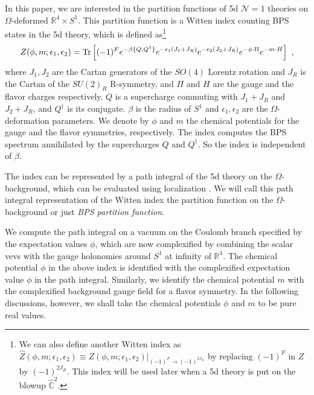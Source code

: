 In this paper, we are interested in the partition functions of 5d $\mathcal{N}=1$ theories on $\Omega$-deformed $\mathbb{R}^4\times S^1$. This partition function is a Witten index counting BPS states in the 5d theory, which is defined as\footnote{We can also define another Witten index as $\hat{Z}(\phi,m;\epsilon_1,\epsilon_2) \equiv Z(\phi,m;\epsilon_1,\epsilon_2)|_{(-1)^F\rightarrow (-1)^{2J_R}}$ by replacing $(-1)^F$ in $Z$ by $(-1)^{2J_R}$. This index will be used later when a 5d theory is put on the blowup $\hat{\mathbb{C}}^2$.} \cite{Nekrasov:2002qd}
\begin{equation}\label{eq:Z}
	Z(\phi,m;\epsilon_1,\epsilon_2) = {\rm Tr}\left[(-1)^Fe^{-\beta\{Q,Q^\dagger\}}e^{-\epsilon_1(J_1+J_R)}e^{-\epsilon_2(J_2+J_R)}e^{-\phi\cdot \Pi}e^{-m\cdot H}\right] \ ,
\end{equation} 
where $J_1,J_2$ are the Cartan generators of the $SO(4)$ Lorentz rotation and $J_R$ is the Cartan of the $SU(2)_R$ R-symmetry, and $\Pi$ and $H$ are the gauge and the flavor charges respectively. $Q$ is a supercharge commuting with $J_1+J_R$ and $J_2+J_R$, and $Q^\dagger$ is its conjugate. $\beta$ is the radius of $S^1$ and $\epsilon_1,\epsilon_2$ are the $\Omega$-deformation parameters. We denote by $\phi$ and $m$ the chemical potentials for the gauge and the flavor symmetries, respectively. The index computes the BPS spectrum annihilated by the supercharges $Q$ and $Q^\dagger$. So the index is independent of $\beta$.

The index can be represented by a path integral of the 5d theory on the $\Omega$-background, which can be evaluated using localization \cite{Kim:2011mv,Kim:2012gu,Hwang:2014uwa}. We will call this path integral representation of the Witten index the partition function on the $\Omega$-background or just {\it BPS partition function}.

We compute the path integral on a vacuum on the Coulomb branch specified by the expectation values $\phi$, which are now complexified by combining the scalar vevs with the gauge holonomies around $S^1$ at infinity of $\mathbb{R}^4$. The chemical potential $\phi$ in the above index is identified with the complexified expectation value $\phi$ in the path integral. Similarly, we identify the chemical potential $m$ with the complexified background gauge field for a flavor symmetry. In the following discussions, however, we shall take the chemical potentials $\phi$ and $m$ to be pure real values.

